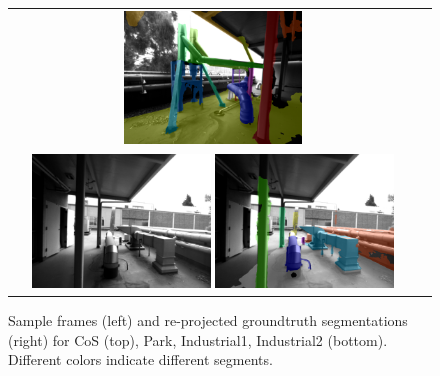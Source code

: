 \begin{figure}
\begin{center}
{{\begin{tabular}{cc}
        		{\includegraphics[width=0.45\textwidth]{figs/pipes2/gtseg_0059.png}}
        		\\
        		{\includegraphics[width=0.45\textwidth]{figs/pipes3/im_0007.png}}
        		{\includegraphics[width=0.45\textwidth]{figs/pipes3/gtseg_0007.png}}
              \end{tabular}
            }
      }
\end{center}
   \caption{\small Sample frames (left) and re-projected groundtruth segmentations (right) for CoS (top), Park, Industrial1, Industrial2 (bottom). Different colors indicate different segments.}
\label{fig:gtSegs}
\end{figure}

